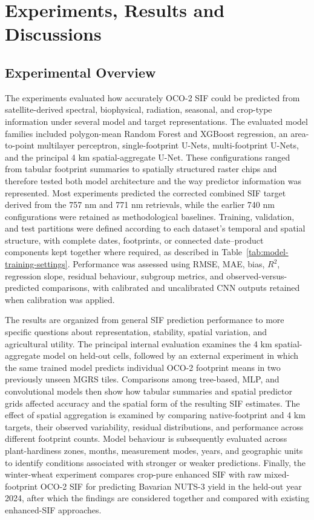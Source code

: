 \chapter{Experiments, Results and Discussions\label{cha:chapter6}}

\section{Experimental Overview}

The experiments evaluated how accurately OCO-2 SIF could be predicted from satellite-derived spectral, biophysical, radiation, seasonal, and crop-type information under several model and target representations. The evaluated model families included polygon-mean Random Forest and XGBoost regression, an area-to-point multilayer perceptron, single-footprint U-Nets, multi-footprint U-Nets, and the principal 4 km spatial-aggregate U-Net. These configurations ranged from tabular footprint summaries to spatially structured raster chips and therefore tested both model architecture and the way predictor information was represented. Most experiments predicted the corrected combined SIF target derived from the 757 nm and 771 nm retrievals, while the earlier 740 nm configurations were retained as methodological baselines. Training, validation, and test partitions were defined according to each dataset's temporal and spatial structure, with complete dates, footprints, or connected date--product components kept together where required, as described in Table~\ref{tab:model-training-settings}. Performance was assessed using RMSE, MAE, bias, $R^2$, regression slope, residual behaviour, subgroup metrics, and observed-versus-predicted comparisons, with calibrated and uncalibrated CNN outputs retained when calibration was applied.

The results are organized from general SIF prediction performance to more specific questions about representation, stability, spatial variation, and agricultural utility. The principal internal evaluation examines the 4 km spatial-aggregate model on held-out cells, followed by an external experiment in which the same trained model predicts individual OCO-2 footprint means in two previously unseen MGRS tiles. Comparisons among tree-based, MLP, and convolutional models then show how tabular summaries and spatial predictor grids affected accuracy and the spatial form of the resulting SIF estimates. The effect of spatial aggregation is examined by comparing native-footprint and 4 km targets, their observed variability, residual distributions, and performance across different footprint counts. Model behaviour is subsequently evaluated across plant-hardiness zones, months, measurement modes, years, and geographic units to identify conditions associated with stronger or weaker predictions. Finally, the winter-wheat experiment compares crop-pure enhanced SIF with raw mixed-footprint OCO-2 SIF for predicting Bavarian NUTS-3 yield in the held-out year 2024, after which the findings are considered together and compared with existing enhanced-SIF approaches.

